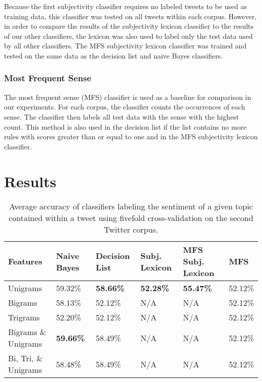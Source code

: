 \documentclass[11pt]{article}
\begin{document}
\indent Because the first subjectivity classifier requires no labeled tweets to be used as training data, this classifier was tested on all tweets within each corpus. However, in order to compare the results of the subjectivity lexicon classifier to the results of our other classifiers, the lexicon was also used to label only the test data used by all other classifiers. The MFS subjectivity lexicon classifier was trained and tested on the same data as the decision list and naive Bayes classifiers. 

\subsubsection*{Most Frequent Sense}
The most frequent sense (MFS) classifier is used as a baseline for comparison in our experiments. For each corpus, the classifier counts the occurrences of each sense. The classifier then labels all test data with the sense with the highest count. This method is also used in the decision list if the list contains no more rules with scores greater than or equal to one and in the MFS subjectivity lexicon classifier.

\section{Results}
\begin{table*}[htb!]
  \centering
  \begin{tabular}{| l || l | l | l | l | l |}
  \hline
  Features & Naive Bayes & Decision List & Subj. Lexicon & MFS Subj. Lexicon & MFS \\ 
  \hline \hline
  Unigrams              & 59.32\%      & \bf{58.66}\% & \bf{52.28}\% & \bf{55.47\%} & 52.12\% \\  \hline
  Bigrams               & 58.13\%      & 52.12\%      & N/A          & N/A          & 52.12\% \\  \hline
  Trigrams              & 52.20\%      & 52.12\%      & N/A          & N/A          & 52.12\% \\  \hline
  Bigrams \& Unigrams   & \bf{59.66}\% & 58.49\%      & N/A          & N/A          & 52.12\% \\  \hline
  Bi, Tri, \& Unigrams  & 58.48\%      & 58.49\%      & N/A          & N/A          & 52.12\% \\  \hline
  \end{tabular}
  \caption{Average accuracy of classifiers labeling the sentiment of a given topic contained within a tweet using fivefold cross-validation on the second Twitter corpus.}
\end{table*}
\end{document}
